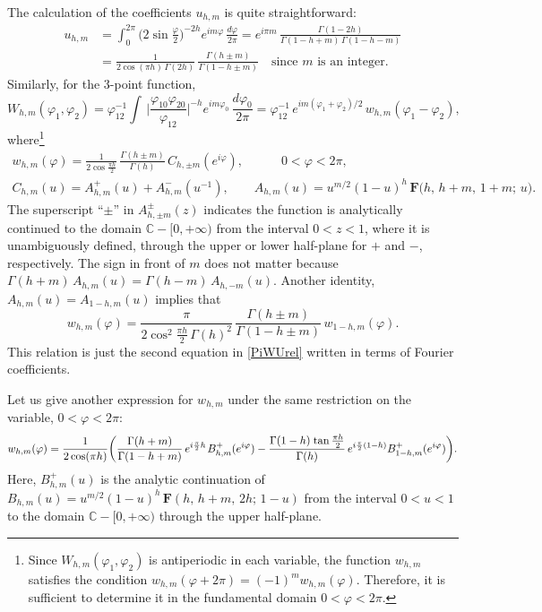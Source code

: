 \documentclass[12pt]{article}
\newcommand*{\useshortskip}[1]{{%
\setlength\abovedisplayskip\abovedisplayshortskip#1}\ignorespaces}
\newcommand{\hgfs}{\mathbf{F}}
\newcommand{\CC}{\mathbb{C}}
\newcommand{\vp}{\varphi}
\begin{document}
The calculation of the coefficients $u_{h,m}$ is quite straightforward:
\begin{equation}
\begin{aligned} \label{Ufourier}
u_{h,m}&=\int_{0}^{2\pi}\bigl(2\sin\tfrac{\vp}{2}\bigr)^{-2h}
e^{im\vp}\,\frac{d\vp}{2\pi}
=e^{i\pi m}\,\frac{\Gamma(1-2h)}{\Gamma(1-h+m)\,\Gamma(1-h-m)}\\[3pt]
&=\frac{1}{2\cos(\pi h)\,\Gamma(2h)}\,\frac{\Gamma(h\pm m)}{\Gamma(1-h\pm m)}
\quad \text{since $m$ is an integer}.
\end{aligned}
\end{equation}
Similarly, for the 3-point function,
\begin{equation} \label{W_hm}
W_{h,m}(\vp_1,\vp_2)
=\vp_{12}^{-1}\int\,\biggl|\frac{\vp_{10}\vp_{20}}{\vp_{12}}\biggr|^{-h}
e^{im\vp_0}\,\frac{d\vp_0}{2\pi}
=\vp_{12}^{-1}\,e^{im(\vp_1+\vp_2)/2}\,w_{h,m}(\vp_1-\vp_2),
\end{equation}
where\footnote{Since $W_{h,m}(\vp_1,\vp_2)$ is antiperiodic in each variable, the function $w_{h,m}$ satisfies the condition $w_{h,m}(\vp+2\pi)=(-1)^{m}w_{h,m}(\vp)$. Therefore, it is sufficient to determine it in the fundamental domain $0<\vp<2\pi$.}
\useshortskip{\begin{gather}
\label{w_hm}
w_{h,m}(\vp)
=\frac{1}{2\cos\frac{\pi h}{2}}\,\frac{\Gamma(h\pm m)}{\Gamma(h)}\,
C_{h,\pm m}(e^{i\vp}),
\qquad\quad 0<\vp<2\pi,
\\[5pt]
C_{h,m}(u)=A^{+}_{h,m}(u)+A^{-}_{h,m}(u^{-1}),\qquad
A_{h,m}(u)=u^{m/2}(1-u)^{h}\,\hgfs\bigl(h,\,h+m,\,1+m;\,u\bigr).
\end{gather}}
The superscript ``$\pm$'' in $A_{h,\pm m}^{\pm}(z)$ indicates the function is analytically continued to the domain $\CC-[0,+\infty)$ from the interval $0<z<1$, where it is unambiguously defined, through the upper or lower half-plane for $+$ and $-$, respectively. The sign in front of $m$ does not matter because $\Gamma(h+m)\,A_{h,m}(u)=\Gamma(h-m)\,A_{h,-m}(u)$. Another identity, $A_{h,m}(u)=A_{1-h,m}(u)$ implies that
\begin{equation}\label{w_h_1-h}
w_{h,m}(\vp)=\frac{\pi}{2\cos^2\frac{\pi h}{2}\,\Gamma(h)^2}\,
\frac{\Gamma(h\pm m)}{\Gamma(1-h\pm m)}\,w_{1-h,m}(\vp).
\end{equation}
This relation is just the second equation in \eqref{PiWUrel} written in terms of Fourier coefficients.

Let us give another expression for $w_{h,m}$ under the same restriction on the variable, $0<\vp<2\pi$:
\begin{equation}\label{w_hm_B}
w_{h,m}(\vp)
=\frac{1}{2\cos(\pi h)}\biggl(
\frac{\Gamma(h+m)}{\Gamma(1-h+m)}\,
e^{i\frac{\pi}{2}h}\kern1pt B_{h,m}^{+}(e^{i\vp})
-\frac{\Gamma(1-h)\kern1pt\tan\frac{\pi h}{2}}{\Gamma(h)}\,
e^{i\frac{\pi}{2}(1-h)} B_{1-h,m}^{+}(e^{i\vp})\biggr).
\end{equation}
Here, $B_{h,m}^{+}(u)$ is the analytic continuation of $B_{h,m}(u)=u^{m/2}(1-u)^{h}\,\hgfs(h,\,h+m,\,2h;\,1-u)$ from the interval $0<u<1$ to the domain $\CC-[0,+\infty)$ through the upper half-plane.
\end{document}
